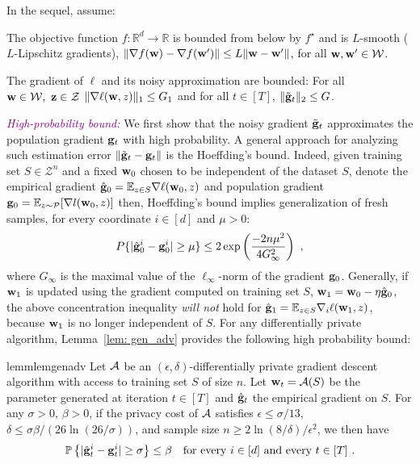 \documentclass[11pt]{article}
\begin{document}
In the sequel, assume:
\begin{assumption}
The objective function $ f: \mathbb{R}^d \rightarrow \mathbb{R}$ is bounded from below by $f^\star$ and is $L$-smooth ($L$-Lipschitz gradients), \ie$\nonumber \|\nabla f(\mathbf{w}) -\nabla f(\mathbf{w}^\prime) \|\leq L \|\mathbf{w}-\mathbf{w}^\prime \|$, for all $\w, \w^\prime \in \cW$.
\end{assumption}
\begin{assumption}
The gradient of $\ell$ and its noisy approximation are bounded: For all $\w \in \cW, \  \z \in \cZ$ $\|\nabla \ell (\mathbf{w}, z) \|_1 \leq G_1$ and for all $t \in [T]$, $\|\tilde {\mathbf{g}}_t\|_2 \leq G$.
\end{assumption}


\textcolor{purple}{\textit{High-probability bound:}}
We first show that the noisy gradient $\tilde {\mathbf{g}}_t$ approximates the population gradient $\mathbf{g}_t$ with high probability.
A general approach for analyzing such estimation error $\| \tilde {\mathbf{g}}_t - \mathbf{g}_t\|$ is the Hoeffding's bound. 
Indeed, given training set $S \in \mathcal{Z}^n$ and a fixed $\mathbf{w}_0$ chosen to be independent of the dataset $S$, denote the empirical gradient $\hat {\mathbf{g}}_0= \mathbb{E}_{z \in S}\nabla \ell(\mathbf{w}_0,z)$ and population gradient $\mathbf{g}_0 = \mathbb{E}_{z\sim \mathcal{P}}[\nabla l(\mathbf{w}_0,z)]$ then, Hoeffding's bound implies generalization of fresh samples, \ie for every coordinate $i \in [d]$ and $\mu > 0$:
\begin{equation} \label{hoeffding}
P\{|\hat {\mathbf{g}}^i_0 - \mathbf{g}_0^i | \geq \mu \} \leq2 \exp \left(\frac{-2n\mu^2}{4G_\infty^2} \right)~,
\end{equation}
 where $G_\infty$ is the maximal value of the $\ell_\infty$-norm of the gradient $ \mathbf{g}_0$. 
Generally, if $\mathbf{w}_1$ is updated using the gradient computed on training set $S$, \ie $\mathbf{w}_1 = \mathbf{w}_0 - \eta \hat {\mathbf{g}}_0$, the above concentration inequality \emph{will not} hold for $\hat {\mathbf{g}}_1 = \mathbb{E}_{z \in S}\nabla_i \ell(\mathbf{w}_1,z)$, because $\mathbf{w}_1$ is no longer independent of $S$. 
For any differentially private algorithm, Lemma~\ref{lem: gen_adv} provides the following high probability bound:  
\begin{restatable}{lemm}{lemgenadv}
\label{lem: gen_adv}
	Let $\cA$ be an $(\epsilon, \delta)$-differentially private gradient descent algorithm with access to training set $S$ of size $n$. Let $\w_t = \cA(S)$ be the parameter generated at iteration $t \in [T]$ and $\hat {\mathbf{g}}_t$ the empirical gradient on $S$. For any $\sigma >0$, $\beta > 0$, if the privacy cost of $\cA$ satisfies $\epsilon \leq \sigma/13$, $\delta \leq \sigma \beta/(26 \ln(26/\sigma))$, and sample size $n \geq 2\ln(8/\delta)/\epsilon^2$, we then have
	\begin{equation*}
	\mathbb{P}\left\{ |\hat {\mathbf{g}}_t^i - \mathbf{g}_t^i| \geq  \sigma \right\} \leq \beta \quad \textrm{for every $ i\in [d]$ and every $t \in [T]$} ~.
	\end{equation*} 
\end{restatable}
\end{document}
